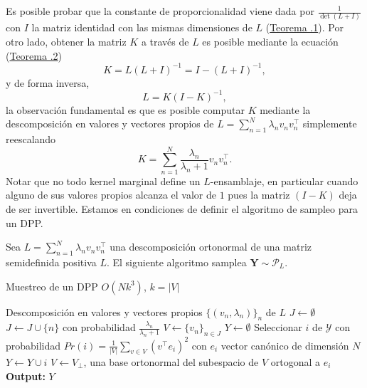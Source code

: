 \vspace{0.2cm}

Es posible probar que la constante de proporcionalidad viene dada por $\frac{1}{\det(L + I)}$ con $I$ la matriz identidad con las mismas dimensiones de $L$ (\hyperlink{Teorema .1}{Teorema .1}). Por otro lado, obtener la matriz $K$ a través de $L$ es posible mediante la ecuación (\hyperlink{Teorema .2}{Teorema .2})
\[
K = L(L+I)^{-1} = I - (L+I)^{-1} , 
\]
y de forma inversa, 
\[
L = K(I-K)^{-1} , 
\]
la observación fundamental es que es posible computar $K$ mediante la descomposición en valores y vectores propios de $L = \sum_{n=1}^{N} \lambda_nv_n v^{\top}_n$ simplemente reescalando 
\[
K = \sum_{n=1}^{N}\frac{\lambda_n}{\lambda_n + 1}v_n v^{\top}_n .
\]
Notar que no todo kernel marginal define un $L$-ensamblaje, en particular cuando alguno de sus valores propios alcanza el valor de $1$ pues la matriz $(I-K)$ deja de ser invertible. Estamos en condiciones de definir el algoritmo de sampleo para un DPP.

\begin{teo}
Sea $L = \sum_{n=1}^N \lambda_n v_n v_{n}^{\top}$ una descomposición ortonormal de una matriz semidefinida positiva $L$. El siguiente algoritmo samplea $\mathbf{Y} \sim \mathcal{P}_L$.

\begin{algorithm}
\caption{Muestreo de un DPP $O(Nk^3)$, $k = |V|$}\label{alg:alg1}
\begin{algorithmic}
\Require Descomposición en valores y vectores propios 
$\{(v_n , \lambda_n)\}_{n}$ de $L$
\State $J \gets \emptyset$
\State $J \gets J \cup \{n\}$ con probabilidad $\frac{\lambda_n}{\lambda_n+1}$
\EndFor
\State $V \gets \{ v_n \}_{n \in J}$
\State $Y \gets \emptyset$
\State Seleccionar $i$ de $\mathcal{Y}$ con probabilidad $Pr(i) = \frac{1}{|V|}\sum_{v \in V}(v^{\top}e_i)^2$ con $e_i$ vector canónico de dimensión $N$                                                                               
\State $Y \gets Y \cup i$
\State $V \gets V_{\perp}$, una base ortonormal del subespacio de $V$ ortogonal a $e_i$ 
\EndWhile   
\State \textbf{Output: } $Y$
\end{algorithmic}
\end{algorithm}
\end{teo}

